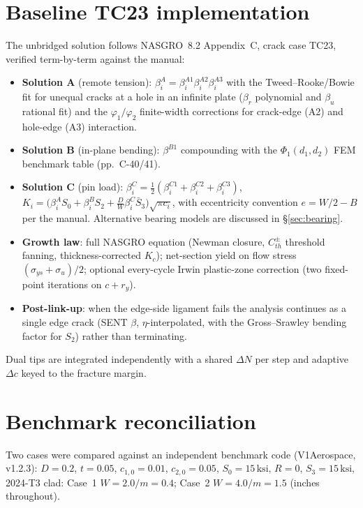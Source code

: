 \documentclass[11pt]{article}
\newcommand{\ksi}{\,\mathrm{ksi}}
\begin{document}
\section{Baseline TC23 implementation}

The unbridged solution follows NASGRO~8.2 Appendix~C, crack case TC23,
verified term-by-term against the manual:

\begin{itemize}
\item \textbf{Solution A} (remote tension): $\beta_i^A=\beta_i^{A1}\beta_i^{A2}\beta_i^{A3}$
  with the Tweed--Rooke/Bowie fit for unequal cracks at a hole in an
  infinite plate ($\beta_r$ polynomial and $\beta_u$ rational fit) and the
  $\varphi_1/\varphi_2$ finite-width corrections for crack-edge (A2) and
  hole-edge (A3) interaction.
\item \textbf{Solution B} (in-plane bending): $\beta^{B1}$ compounding with the
  $\Phi_1(d_1,d_2)$ FEM benchmark table (pp.~C-40/41).
\item \textbf{Solution C} (pin load): $\beta_i^C=\tfrac12(\beta_i^{C1}+\beta_i^{C2}+\beta_i^{C3})$,
  $K_i=\bigl(\beta_i^A S_0+\beta_i^B S_2+\tfrac{D}{W}\beta_i^C \bar S_3\bigr)\sqrt{\pi c_i}$,
  with eccentricity convention $e=W/2-B$ per the manual. Alternative bearing
  models are discussed in \S\ref{sec:bearing}.
\item \textbf{Growth law}: full NASGRO equation (Newman closure, $C_{th}^{\pm}$
  threshold fanning, thickness-corrected $K_c$); net-section yield on flow
  stress $(\sigma_{ys}+\sigma_u)/2$; optional every-cycle Irwin plastic-zone
  correction (two fixed-point iterations on $c+r_y$).
\item \textbf{Post-link-up}: when the edge-side ligament fails the analysis
  continues as a single edge crack (SENT $\beta$, $\eta$-interpolated, with
  the Gross--Srawley bending factor for $S_2$) rather than terminating.
\end{itemize}

Dual tips are integrated independently with a shared $\Delta N$ per step and
adaptive $\Delta c$ keyed to the fracture margin.

\section{Benchmark reconciliation}
\label{sec:bench}

Two cases were compared against an independent benchmark code
(V1Aerospace, v1.2.3): $D=0.2$, $t=0.05$, $c_{1,0}=0.01$, $c_{2,0}=0.05$,
$S_0=15\ksi$, $R=0$, $S_3=15\ksi$, 2024-T3 clad:
Case~1 $W=2.0/m=0.4$; Case~2 $W=4.0/m=1.5$ (inches throughout).
\end{document}
